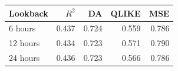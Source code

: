 \begin{tabular}{lrrrr}
\toprule
Lookback & $R^2$ & DA & QLIKE & MSE \\
\midrule
6 hours & 0.437 & 0.724 & 0.559 & 0.786 \\
12 hours & 0.434 & 0.723 & 0.571 & 0.790 \\
24 hours & 0.436 & 0.723 & 0.566 & 0.786 \\
\bottomrule
\end{tabular}
